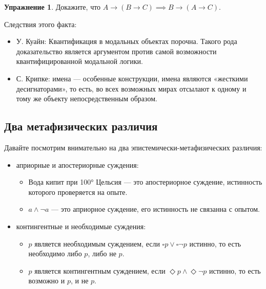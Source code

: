\documentclass[openany]{book}
\theoremstyle{plain}
\theoremstyle{definition}
\newtheorem{xrc}{Упражнение}[]
\begin{document}
\begin{xrc} 
Докажите, что \(A \to (B \to C) \implies B \to (A \to C)\). 
\end{xrc}

Следствия этого факта:
\begin{itemize}
\item У. Куайн: Квантификация в модальных объектах порочна. Такого рода доказательство является аргументом против самой возможности квантифицированной модальной логики. 
\item С. Крипке: имена — особенные конструкции, имена являются «жесткими десигнаторами», то есть, во всех возможных мирах отсылают к одному и тому же объекту непосредственным образом.
\end{itemize}

\subsection{ Два метафизических различия }

Давайте посмотрим внимательно на два эпистемически-метафизических различия:
\begin{itemize}
\item априорные и апостериорные суждения:
	\begin{itemize}
		\item Вода кипит при 100° Цельсия — это апостериорное суждение, истинность которого проверяется на опыте.
		\item \(a \land \neg a\) — это априорное суждение, его истинность не связанна с опытом.
	\end{itemize}
\item контингентные и необходимые суждения:
	\begin{itemize}
		\item \(p\) является необходимым суждением, если \(\square p \lor \square \neg p\) истинно, то есть необходимо либо \(p\), либо не \(p\).
		\item \(p\) является контингентным суждением, если \(\Diamond p \land \Diamond \neg p\) истинно, то есть возможно и \(p\), и не \(p\).
	\end{itemize}
\end{itemize}    
\end{document}
